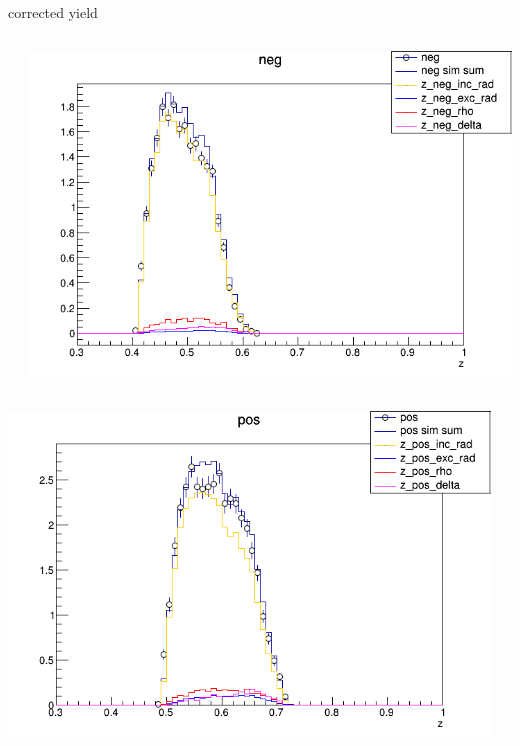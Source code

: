 \begin{frame}{corrected yield}
\begin{columns}
\begin{column}[T]{0.25\textwidth}
\end{column}
\begin{column}[T]{0.25\textwidth}
\includegraphics[width = \textwidth]{results/yield/statistics_corr/yield_x_Q2_z_0.65_5.500_0.50_neg.png}
\end{column}
\end{columns}
\begin{columns}
\begin{column}[T]{0.25\textwidth}
\includegraphics[width = \textwidth]{results/yield/statistics_corr/yield_x_Q2_z_0.65_5.500_0.60_pos.png}
\end{column}
\begin{column}[T]{0.25\textwidth}

\end{column}
\end{columns}
\end{frame}
